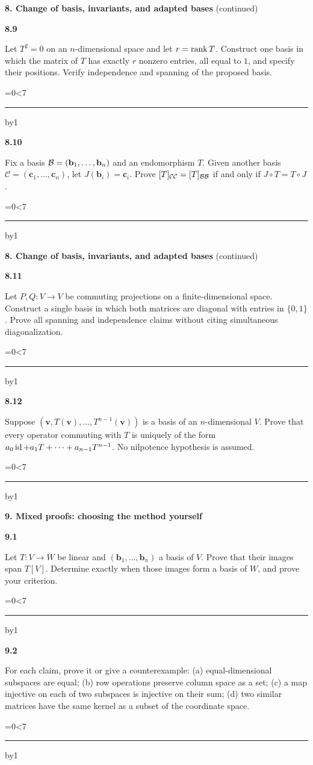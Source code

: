 \documentclass[11pt,letterpaper]{article}
\newcommand{\topicshort}{Problem collection}
\newcommand{\ruled}[1]{\par\begingroup\parskip=0pt\baselineskip=17pt\count255=0\loop\ifnum\count255<#1\noindent\textcolor{black!17}{\rule{\linewidth}{.25pt}}\par\advance\count255 by1\repeat\endgroup}
\newcommand{\problem}[4]{\noindent\begin{minipage}[t][3.48in][t]{\linewidth}\textbf{\color{navy}#1}\quad{\small\sffamily\color{teal}#2#3}\par #4\par\vfill\ruled{7}\end{minipage}}
\begin{document}
{\large\bfseries\color{navy}8. Change of basis, invariants, and adapted bases} {\small(continued)}\par\vspace{9pt}
\problem{8.9}{M}{}{Let $T^2=0$ on an $n$-dimensional space and let $r=\operatorname{rank} T$. Construct one basis in which the matrix of $T$ has exactly $r$ nonzero entries, all equal to $1$, and specify their positions. Verify independence and spanning of the proposed basis.}
\par\vspace{14pt}
\problem{8.10}{M}{}{Fix a basis $\mathcal B=(\mathbf b_1,\ldots,\mathbf b_n)$ and an endomorphism $T$. Given another basis $\mathcal C=(\mathbf c_1,\ldots,\mathbf c_n)$, let $J(\mathbf b_i)=\mathbf c_i$. Prove $[T]_{\mathcal C\mathcal C}=[T]_{\mathcal B\mathcal B}$ if and only if $J\circ T=T\circ J$.}
\newpage
\renewcommand{\topicshort}{Change of basis}
{\large\bfseries\color{navy}8. Change of basis, invariants, and adapted bases} {\small(continued)}\par\vspace{9pt}
\problem{8.11}{C}{}{Let $P,Q:V\to V$ be commuting projections on a finite-dimensional space. Construct a single basis in which both matrices are diagonal with entries in $\{0,1\}$. Prove all spanning and independence claims without citing simultaneous diagonalization.}
\par\vspace{14pt}
\problem{8.12}{C}{}{Suppose $(\mathbf v,T(\mathbf v),\ldots,T^{n-1}(\mathbf v))$ is a basis of an $n$-dimensional $V$. Prove that every operator commuting with $T$ is uniquely of the form $a_0\operatorname{id}+a_1T+\cdots+a_{n-1}T^{n-1}$. No nilpotence hypothesis is assumed.}
\newpage
\renewcommand{\topicshort}{Mixed proofs}
{\large\bfseries\color{navy}9. Mixed proofs: choosing the method yourself}\par\vspace{9pt}
\problem{9.1}{W}{}{Let $T:V\to W$ be linear and $(\mathbf b_1,\ldots,\mathbf b_n)$ a basis of $V$. Prove that their images span $T[V]$. Determine exactly when those images form a basis of $W$, and prove your criterion.}
\par\vspace{14pt}
\problem{9.2}{W}{}{For each claim, prove it or give a counterexample: (a) equal-dimensional subspaces are equal; (b) row operations preserve column space as a set; (c) a map injective on each of two subspaces is injective on their sum; (d) two similar matrices have the same kernel as a subset of the coordinate space.}
\end{document}
